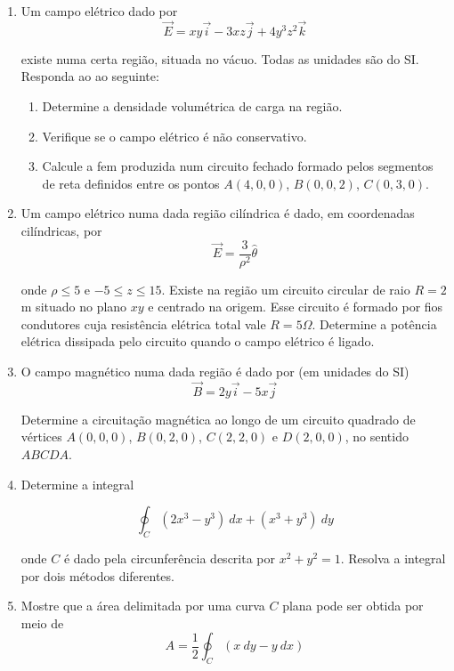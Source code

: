 \documentclass[11pt,a4paper]{article}
\begin{document}
\begin{enumerate}
	\item Um campo elétrico dado por
	$$\vec{E} = xy \vec{i} - 3xz\vec{j} + 4y^3z^2\vec{k}$$ 
	
	existe numa certa região, situada no vácuo. Todas as unidades são do SI. Responda ao ao seguinte:
	
	\begin{enumerate}[label=(\roman*)]
       \item Determine a densidade volumétrica de carga na região.
       \item Verifique se o campo elétrico é não conservativo.
       \item Calcule a fem produzida num circuito fechado formado pelos segmentos de reta definidos entre os pontos $A(4 \textrm{,}\ 0 \textrm{,}\ 0)$, $B(0 \textrm{,}\ 0 \textrm{,}\ 2)$, $C(0 \textrm{,}\ 3 \textrm{,}\ 0)$.
      \end{enumerate}
      
     \item Um campo elétrico numa dada região cilíndrica é dado, em coordenadas cilíndricas, por
     $$\vec{E} = \displaystyle\dfrac{3}{\rho^2}\hat{\theta}$$
     
     onde $\rho \leq 5$ e $-5 \leq z \le1 5$. Existe na região um circuito circular de raio $R = 2$ m situado no plano $xy$ e centrado na origem. Esse circuito é formado por fios condutores cuja resistência elétrica total vale $R = 5 \Omega$. Determine a potência elétrica dissipada pelo circuito quando o campo elétrico é ligado. 
     
     \item O campo magnético numa dada região é dado por (em unidades do SI)
     $$\vec{B} = 2y \vec{i} - 5x\vec{j}$$
     
     Determine a circuitação magnética ao longo de um circuito quadrado de vértices $A(0 \textrm{,}\ 0 \textrm{,}\ 0)$, $B(0 \textrm{,}\ 2 \textrm{,}\ 0)$, $C(2 \textrm{,}\ 2 \textrm{,}\ 0)$ e $D(2 \textrm{,}\ 0 \textrm{,}\ 0)$, no sentido $ABCDA$. 
     
     \item Determine a integral 
     
     $$\displaystyle\oint_C (2x^3 - y^3) \ dx + (x^3 + y^3) \ dy$$
     
     onde $C$ é dado pela circunferência descrita por $x^2 + y^2 = 1$. Resolva a integral por dois métodos diferentes.
     
     \item Mostre que a área delimitada por uma curva $C$ plana pode ser obtida por meio de
     $$A = \displaystyle\dfrac{1}{2}\oint_C (x \ dy - y \ dx)$$ 
     

\end{enumerate}
\end{document}
